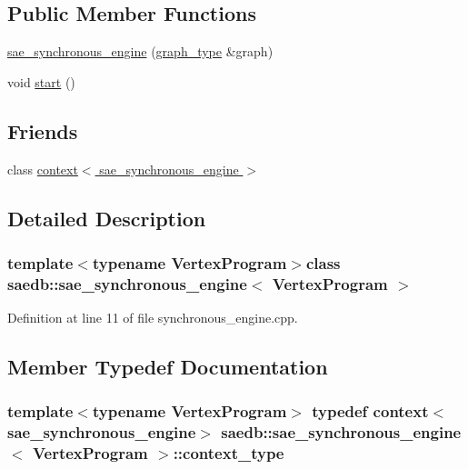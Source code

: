 \subsection*{Public Member Functions}
\begin{DoxyCompactItemize}
\item 
\hyperlink{classsaedb_1_1sae__synchronous__engine_a5f0b83dfbba3033caf57ad3cbfe7de14}{sae\-\_\-synchronous\-\_\-engine} (\hyperlink{classsaedb_1_1sae__synchronous__engine_a1eb5ce9b2d9118a21a615211fb026a0e}{graph\-\_\-type} \&graph)
\item 
void \hyperlink{classsaedb_1_1sae__synchronous__engine_ae6ad2329d41adb55a040ea4a5b667fac}{start} ()
\end{DoxyCompactItemize}
\subsection*{Friends}
\begin{DoxyCompactItemize}
\item 
class \hyperlink{classsaedb_1_1sae__synchronous__engine_a72bdaebdaeffea541642d5d80c4ab985}{context$<$ sae\-\_\-synchronous\-\_\-engine $>$}
\end{DoxyCompactItemize}


\subsection{Detailed Description}
\subsubsection*{template$<$typename Vertex\-Program$>$class saedb\-::sae\-\_\-synchronous\-\_\-engine$<$ Vertex\-Program $>$}



Definition at line 11 of file synchronous\-\_\-engine.\-cpp.



\subsection{Member Typedef Documentation}
\hypertarget{classsaedb_1_1sae__synchronous__engine_a82839f59e66261a2b6f9ae981036e674}{
\subsubsection[{context\-\_\-type}]{\setlength{\rightskip}{0pt plus 5cm}template$<$typename Vertex\-Program$>$ typedef {\bf context}$<${\bf sae\-\_\-synchronous\-\_\-engine}$>$ {\bf saedb\-::sae\-\_\-synchronous\-\_\-engine}$<$ Vertex\-Program $>$\-::{\bf context\-\_\-type}}}\label{d7/d39/classsaedb_1_1sae__synchronous__engine_a82839f59e66261a2b6f9ae981036e674}


